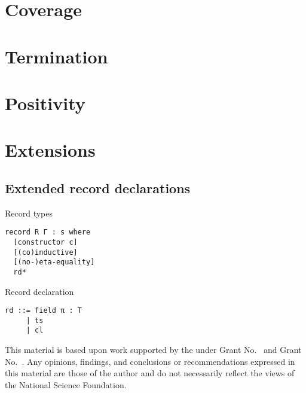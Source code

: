 \documentclass[acmlarge]{acmart}\settopmatter{}
\renewcommand{\|}{|}
\begin{document}
\section{Coverage}
\label{sec:coverage}

\section{Termination}
\label{sec:termination}

\section{Positivity}
\label{sec:positivity}

\section{Extensions}
\label{sec:extensions}

\subsection{Extended record declarations}

Record types
\begin{verbatim}
record R Γ : s where
  [constructor c]
  [(co)inductive]
  [(no-)eta-equality]
  rd*
\end{verbatim}

Record declaration
\begin{verbatim}
rd ::= field π : T
     | ts
     | cl 
\end{verbatim}


\begin{acks}                            %
  This material is based upon work supported by the
   under Grant
  No.~ and Grant
  No.~.  Any opinions, findings, and
  conclusions or recommendations expressed in this material are those
  of the author and do not necessarily reflect the views of the
  National Science Foundation.
\end{acks}


%


\end{document}
